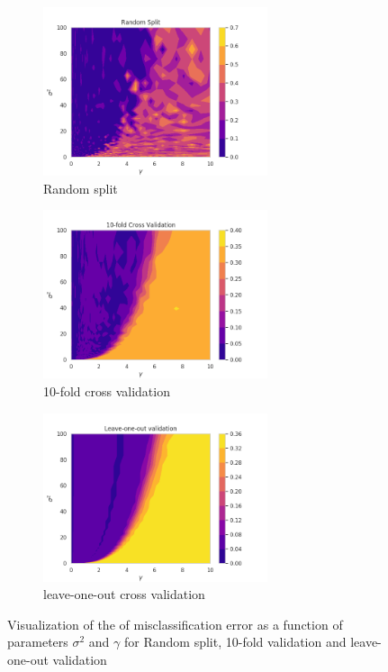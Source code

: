 \documentclass{article}
\begin{document}
\begin{figure}
\begin{subfigure}{0.3\textwidth}
   \includegraphics[width=6.6cm]{randomsplit}
   \caption{Random split} \label{fig:x_a}
\end{subfigure}
\hspace*{\fill}
\begin{subfigure}{0.3\textwidth}
   \includegraphics[width=6.6cm]{10fold}
   \caption{10-fold cross validation} \label{fig:x_b}
\end{subfigure}
\hspace*{\fill}
\begin{subfigure}{0.3\textwidth}
   \includegraphics[width=6.6cm]{leaveone}
   \caption{leave-one-out cross validation } \label{fig:x_c}
\end{subfigure}


\caption{Visualization of the of misclassification error as a function of parameters $\sigma^2$ and $\gamma$ for Random split, 10-fold validation and leave-one-out validation }
 \label{fig:val}
\end{figure}
\end{document}
